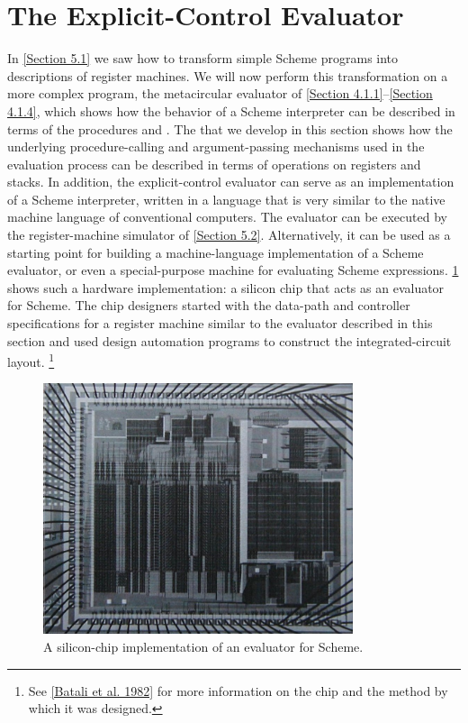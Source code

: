\section{The Explicit-Control Evaluator}
\label{Section 5.4}

In \cref{Section 5.1} we saw how to transform simple Scheme programs into descriptions of register machines.
We will now perform this transformation on a more complex program, the metacircular evaluator of \cref{Section 4.1.1}--\cref{Section 4.1.4}, which shows how the behavior of a Scheme interpreter can be described in terms of the procedures  and .
The  that we develop in this section shows how the underlying procedure-calling and argument-passing mechanisms used in the evaluation process can be described in terms of operations on registers and stacks.
In addition, the explicit-control evaluator can serve as an implementation of a Scheme interpreter, written in a language that is very similar to the native machine language of conventional computers.
The evaluator can be executed by the register-machine simulator of \cref{Section 5.2}.
Alternatively, it can be used as a starting point for building a machine-language implementation of a Scheme evaluator, or even a special-purpose machine for evaluating Scheme expressions.
\cref{Figure 5.16} shows such a hardware implementation:
a silicon chip that acts as an evaluator for Scheme.
The chip designers started with the data-path and controller specifications for a register machine similar to the evaluator described in this section and used design automation programs to construct the integrated-circuit layout.%
\footnote{
	See \cref{Batali et al. 1982} for more information on the chip and the method by which it was designed.
}

\begin{figure}[tb]
	\centering
	\includegraphics[width=91mm]{fig/chap5/chip.jpg}
	\caption{
		A silicon-chip implementation of an evaluator for Scheme.
	}
	\label{Figure 5.16}
\end{figure}



